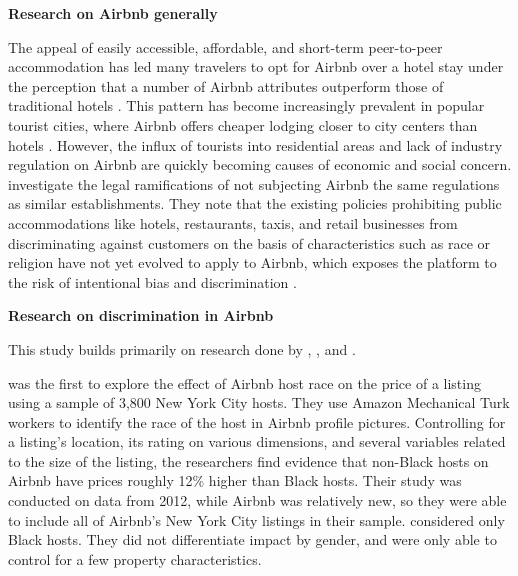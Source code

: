 \vspace{5mm}
\textbf{Research on Airbnb generally}

The appeal of easily accessible, affordable, and short-term peer-to-peer accommodation has led many travelers to opt for Airbnb over a hotel stay under the perception that a number of Airbnb attributes outperform those of traditional hotels \citep{guttentag}. This pattern has become increasingly prevalent in popular tourist cities, where Airbnb offers cheaper lodging closer to city centers than hotels \citep{gutierrez}. However, the influx of tourists into residential areas and lack of industry regulation on Airbnb are quickly becoming causes of economic and social concern. \cite{leong} investigate the legal ramifications of not subjecting Airbnb the same regulations as similar establishments. They note that the existing policies prohibiting public accommodations like hotels, restaurants, taxis, and retail businesses from discriminating against customers on the basis of characteristics such as race or religion have not yet evolved to apply to Airbnb, which exposes the platform to the risk of intentional bias and discrimination \citep{leong}. 




\vspace{5mm}
\textbf{Research on discrimination in Airbnb}

This study builds primarily on research done by \cite{edelman}, \cite{wang}, and \cite{kakar}. 

\cite{edelman} was the first to explore the effect of Airbnb host race on the price of a listing using a sample of 3,800 New York City hosts. They use Amazon Mechanical Turk workers to identify the race of the host in Airbnb profile pictures. Controlling for a listing's location, its rating on various dimensions, and several variables related to the size of the listing, the researchers find evidence that non-Black hosts on Airbnb have prices roughly 12\% higher than Black hosts. Their study was conducted on data from 2012, while Airbnb was relatively new, so they were able to include all of Airbnb's New York City listings in their sample. \cite{edelman} considered only Black hosts. They did not differentiate impact by gender, and were only able to control for a few property characteristics. 

